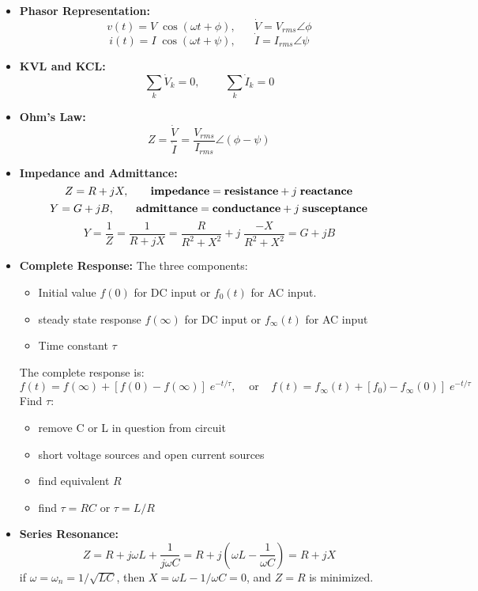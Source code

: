 \documentclass{article}
\begin{document}
\begin{itemize}
\item {\bf Phasor Representation:}
\begin{equation}	
  v(t)=V\;\cos(\omega t +\phi),\;\;\;\;\;\; \dot{V}=V_{rms}\angle{\phi} 
\end{equation}
\begin{equation}
  i(t)=I\;\cos(\omega t +\psi),\;\;\;\;\;\; \dot{I}=I_{rms}\angle{\psi} 
\end{equation}
\item {\bf KVL and KCL:}
\begin{equation}
  \sum_k \dot{V}_k=0,\;\;\;\;\;\;\;\;\sum_k \dot{I}_k=0	
\end{equation}
\item {\bf Ohm's Law:}
\begin{equation}
  Z=\frac{\dot{V}}{\dot{I}}=\frac{V_{rms}}{I_{rms}}\angle{(\phi-\psi)} 
\end{equation}
\item {\bf Impedance and Admittance:}
\begin{equation}
  Z=R+jX,\;\;\;\;\;\;\;
  \mbox{{\bf impedance}}=\mbox{{\bf resistance}}+j\;\mbox{{\bf reactance}} 
\end{equation}
\begin{equation}	
  Y=G+jB,\;\;\;\;\;\;\;
  \mbox{{\bf admittance}}=\mbox{{\bf conductance}}+j\;\mbox{{\bf susceptance}}
\end{equation}
\begin{equation}
  Y=\frac{1}{Z}=\frac{1}{R+jX}=\frac{R}{R^2+X^2}+j\;\frac{-X}{R^2+X^2}=G+jB 
\end{equation}
\item {\bf Complete Response:} The three components:
  \begin{itemize}
  \item Initial value $f(0)$ for DC input or $f_0(t)$ for AC input.
  \item steady state response $f(\infty)$ for DC input or $f_\infty(t)$ for 
    AC input
  \item Time constant $\tau$ 
  \end{itemize}
  The complete response is:
  \begin{equation} 
    f(t)=f(\infty)+[f(0)-f(\infty)]\;e^{-t/\tau},\;\;\;\;\mbox{or}
    \;\;\;\;f(t)=f_\infty(t)+[f_0)-f_\infty(0)]\;e^{-t/\tau}	
  \end{equation}
  Find $\tau$:
  \begin{itemize}
  \item remove C or L in question from circuit
  \item short voltage sources and open current sources
  \item find equivalent $R$
  \item find $\tau=RC$ or $\tau=L/R$
  \end{itemize}
\item {\bf Series Resonance:}
\begin{equation}
  Z=R+j\omega L+\frac{1}{j\omega C}=R+j(\omega L-\frac{1}{\omega C}) =R+jX	 
\end{equation}
if $\omega=\omega_n=1/\sqrt{LC}$, then $X=\omega L-1/\omega C=0$, 
and $Z=R$ is minimized.


\end{itemize}
\end{document}
